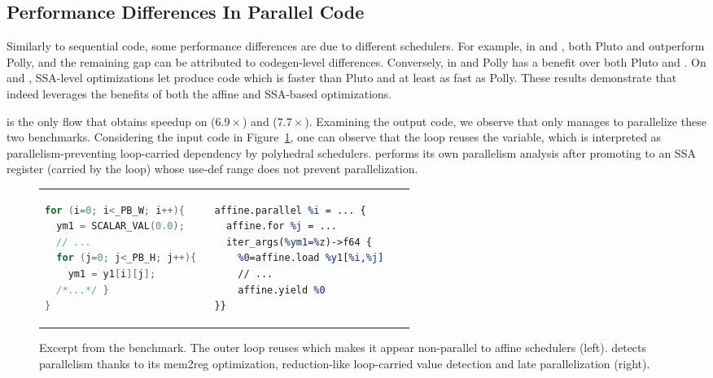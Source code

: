 \subsection{Performance Differences In Parallel Code}\label{sec:parallel_perf_analysis}
Similarly to sequential code, some performance differences are due to different schedulers. For example, in  and , both Pluto and \tool outperform Polly, and the remaining gap can be attributed to codegen-level differences. Conversely, in  and  Polly has a benefit over both Pluto and \tool. On  and , SSA-level optimizations let \tool produce code which is faster than Pluto and at least as fast as Polly. These results demonstrate that \tool indeed leverages the benefits of both the affine and SSA-based optimizations.

\tool is the only flow that obtains speedup on  ($6.9\times$) and  ($7.7\times$). Examining the output code, we observe that only \tool manages to parallelize these two benchmarks. Considering the input code in Figure~\ref{fig:deriche}, one can observe that the  loop reuses the  variable, which is interpreted as parallelism-preventing loop-carried dependency by polyhedral schedulers. \tool performs its own parallelism analysis after promoting  to an SSA register (carried by the  loop) whose use-def range does not prevent parallelization.

\begin{figure}
  \centering
  \begin{tabular}{p{0.44\linewidth}p{0.52\linewidth}}
  {\scriptsize
  \begin{lstlisting}[language=c]
for (i=0; i<_PB_W; i++){
  ym1 = SCALAR_VAL(0.0);
  // ...
  for (j=0; j<_PB_H; j++){
    ym1 = y1[i][j];
  /*...*/ }
}
  \end{lstlisting}
  }&
  {\scriptsize
  \begin{lstlisting}[language=llvm]
%z = constant 0.0 : f64
affine.parallel %i = ... {
  affine.for %j = ...
  iter_args(%ym1=%z)->f64 {
    %0=affine.load %y1[%i,%j]
    // ...
    affine.yield %0
}}
  \end{lstlisting}
  }
  \end{tabular}
  \vspace{-2em}
  \caption{Excerpt from the  benchmark. The outer loop reuses  which makes it appear non-parallel to affine schedulers (left). \tool detects parallelism thanks to its mem2reg optimization, reduction-like loop-carried  value detection and late parallelization (right).}
  \label{fig:deriche}
\end{figure}

